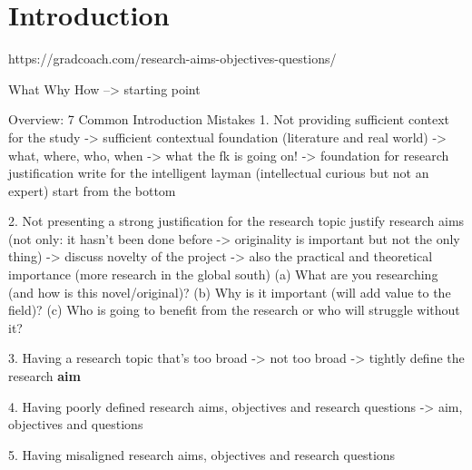 
\chapter{Introduction} %

\label{Chapter1} %


https://gradcoach.com/research-aims-objectives-questions/

What
Why
How
--> starting point

Overview: 7 Common Introduction Mistakes
1. Not providing sufficient context for the study
-> sufficient contextual foundation (literature and real world)
-> what, where, who, when
-> what the fk is going on! -> foundation for research justification
write for the intelligent layman (intellectual curious but not an expert)
start from the bottom

2. Not presenting a strong justification for the research topic
justify research aims (not only: it hasn't been done before -> originality is important but not the only thing)
-> discuss novelty of the project
-> also the practical and theoretical importance (more research in the global south)
(a) What are you researching (and how is this novel/original)?
(b) Why is it important (will add value to the field)?
(c) Who is going to benefit from the research or who will struggle without it?

3. Having a research topic that’s too broad
-> not too broad
-> tightly define the research \textbf{aim}


4. Having poorly defined research aims, objectives and research questions
-> aim, objectives and questions


5. Having misaligned research aims, objectives and research questions


